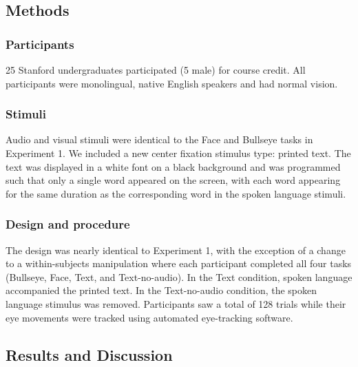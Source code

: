 \documentclass[english,floatsintext,man]{apa6}
\theoremstyle{definition}
\theoremstyle{definition}
\theoremstyle{definition}
\theoremstyle{remark}
\begin{document}
\hypertarget{methods-1}{%
\subsection{Methods}\label{methods-1}}

\hypertarget{participants-1}{%
\subsubsection{Participants}\label{participants-1}}

25 Stanford undergraduates participated (5 male) for course credit. All
participants were monolingual, native English speakers and had normal
vision.

\hypertarget{stimuli-1}{%
\subsubsection{Stimuli}\label{stimuli-1}}

Audio and visual stimuli were identical to the Face and Bullseye tasks
in Experiment 1. We included a new center fixation stimulus type:
printed text. The text was displayed in a white font on a black
background and was programmed such that only a single word appeared on
the screen, with each word appearing for the same duration as the
corresponding word in the spoken language stimuli.

\hypertarget{design-and-procedure-1}{%
\subsubsection{Design and procedure}\label{design-and-procedure-1}}

The design was nearly identical to Experiment 1, with the exception of a
change to a within-subjects manipulation where each participant
completed all four tasks (Bullseye, Face, Text, and Text-no-audio). In
the Text condition, spoken language accompanied the printed text. In the
Text-no-audio condition, the spoken language stimulus was removed.
Participants saw a total of 128 trials while their eye movements were
tracked using automated eye-tracking software.

\hypertarget{results-and-discussion-1}{%
\subsection{Results and Discussion}\label{results-and-discussion-1}}
\end{document}

